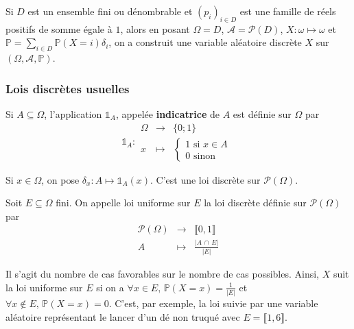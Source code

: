 	\begin{remark}
		Si $D$ est un ensemble fini ou dénombrable et $(p_i)_{i \in D}$ est une famille de réels positifs de somme égale à $1$, alors en posant $\Omega = D$, $\mathcal{A} = \mathcal{P}(D)$, $X : \omega \mapsto \omega$ et $\mathbb{P} = \sum_{i \in D} \mathbb{P}(X = i) \delta_i$, on a construit une variable aléatoire discrète $X$ sur $(\Omega, \mathcal{A}, \mathbb{P})$.
	\end{remark}

	\subsubsection{Lois discrètes usuelles}


	\begin{definition}
		Si $A \subseteq \Omega$, l'application $\mathbb{1}_A$, appelée \textbf{indicatrice} de $A$ est définie sur $\Omega$ par
		\[
			\mathbb{1}_A :
			\begin{array}{ccc}
				\Omega &\rightarrow& \{ 0; 1 \} \\
				x &\mapsto& \begin{cases}
					1 \text{ si } x \in A \\
					0 \text{ sinon}
				\end{cases}
			\end{array}
		\]
	\end{definition}

	\begin{example}
		\label{264-1}
		Si $x \in \Omega$, on pose $\delta_x : A \mapsto \mathbb{1}_A(x)$. C'est une loi discrète sur $\mathcal{P}(\Omega)$.
	\end{example}

	\begin{example}
		Soit $E \subseteq \Omega$ fini. On appelle loi uniforme sur $E$ la loi discrète définie sur $\mathcal{P}(\Omega)$ par
		\[
		\begin{array}{ccc}
			\mathcal{P}(\Omega) &\rightarrow& \llbracket 0, 1 \rrbracket \\
			A &\mapsto& \frac{\vert A \, \cap \, E \vert}{\vert E \vert}
		\end{array}
		\]
	\end{example}

	\begin{remark}
		Il s'agit du nombre de cas favorables sur le nombre de cas possibles. Ainsi, $X$ suit la loi uniforme sur $E$ si on a $\forall x \in E, \, \mathbb{P}(X=x) = \frac{1}{\vert E \vert}$ et $\forall x \notin E, \, \mathbb{P}(X=x) = 0$.
		\newpar
		C'est, par exemple, la loi suivie par une variable aléatoire représentant le lancer d'un dé non truqué avec $E = \llbracket 1, 6 \rrbracket$.
	\end{remark}

